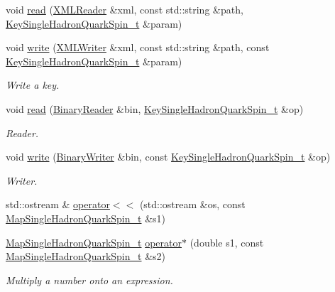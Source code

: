 \begin{DoxyCompactItemize}
\item 
void \mbox{\hyperlink{namespaceHadron_a35b28e298745916c37daa929a874e099}{read}} (\mbox{\hyperlink{classADATXML_1_1XMLReader}{X\+M\+L\+Reader}} \&xml, const std\+::string \&path, \mbox{\hyperlink{structHadron_1_1KeySingleHadronQuarkSpin__t}{Key\+Single\+Hadron\+Quark\+Spin\+\_\+t}} \&param)
\item 
void \mbox{\hyperlink{namespaceHadron_a536d0c7d1bd20e64ba84b0588b3696f9}{write}} (\mbox{\hyperlink{classADATXML_1_1XMLWriter}{X\+M\+L\+Writer}} \&xml, const std\+::string \&path, const \mbox{\hyperlink{structHadron_1_1KeySingleHadronQuarkSpin__t}{Key\+Single\+Hadron\+Quark\+Spin\+\_\+t}} \&param)
\begin{DoxyCompactList}\small\item\em Write a key. \end{DoxyCompactList}\item 
void \mbox{\hyperlink{namespaceHadron_a02133bc62e51d4baa57fb5ba0742ff43}{read}} (\mbox{\hyperlink{classADATIO_1_1BinaryReader}{Binary\+Reader}} \&bin, \mbox{\hyperlink{structHadron_1_1KeySingleHadronQuarkSpin__t}{Key\+Single\+Hadron\+Quark\+Spin\+\_\+t}} \&op)
\begin{DoxyCompactList}\small\item\em Reader. \end{DoxyCompactList}\item 
void \mbox{\hyperlink{namespaceHadron_a780fbaaa0f7e3ba3453b4994b3ecd7d0}{write}} (\mbox{\hyperlink{classADATIO_1_1BinaryWriter}{Binary\+Writer}} \&bin, const \mbox{\hyperlink{structHadron_1_1KeySingleHadronQuarkSpin__t}{Key\+Single\+Hadron\+Quark\+Spin\+\_\+t}} \&op)
\begin{DoxyCompactList}\small\item\em Writer. \end{DoxyCompactList}\item 
std\+::ostream \& \mbox{\hyperlink{namespaceHadron_af9e168289a71f406cf53d10783cc513c}{operator$<$$<$}} (std\+::ostream \&os, const \mbox{\hyperlink{namespaceHadron_a22279e56b59508dc8dd2c8991dc911fd}{Map\+Single\+Hadron\+Quark\+Spin\+\_\+t}} \&s1)
\item 
\mbox{\hyperlink{namespaceHadron_a22279e56b59508dc8dd2c8991dc911fd}{Map\+Single\+Hadron\+Quark\+Spin\+\_\+t}} \mbox{\hyperlink{namespaceHadron_a1ff2284ca0eec3b56aa1c075484c995f}{operator$\ast$}} (double s1, const \mbox{\hyperlink{namespaceHadron_a22279e56b59508dc8dd2c8991dc911fd}{Map\+Single\+Hadron\+Quark\+Spin\+\_\+t}} \&s2)
\begin{DoxyCompactList}\small\item\em Multiply a number onto an expression. \end{DoxyCompactList}\item 

\end{DoxyCompactItemize}
